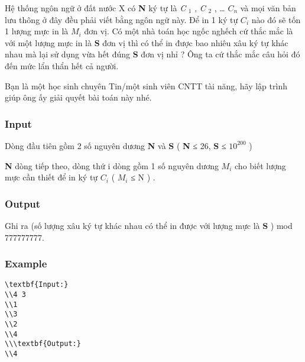 



   Hệ thống ngôn ngữ ở đất nước X có   \textbf{    N   }   ký tự là   \emph{    C   }$_    1   $   ,   \emph{    C   }$_    2   $   , …   \emph{    $C_{n}$}   và mọi văn bản lưu thông ở đây đều phải viết bằng ngôn ngữ này. Để in 1 ký tự   \emph{    $C_{i}$}   nào đó sẽ tốn 1 lượng mực in là   \emph{    $M_{i}$}   đơn vị. Có một nhà toán học ngốc nghếch cứ thắc mắc là với một lượng mực in là   \textbf{    S   }   đơn vị thì có thể in được bao nhiêu xâu ký tự khác nhau mà lại sử dụng vừa hết đúng   \textbf{    S   }   đơn vị nhỉ ? Ông ta cứ thắc mắc câu hỏi đó đến mức lẩn thẩn hết cả người.  

   Bạn là một học sinh chuyên Tin/một sinh viên CNTT tài năng, hãy lập trình giúp ông ấy giải quyết bài toán này nhé.  

\subsubsection{   Input  }

   Dòng đầu tiên gồm 2 số nguyên dương   \textbf{    N   }   và   \textbf{    S   }   (   \textbf{    N   }   ≤ 26,   \textbf{    S   }   ≤ $10^{200}$   )  

\textbf{    N   }   dòng tiếp theo, dòng thứ i dòng gồm 1 số nguyên dương $M_{i}$   cho biết lượng mực cần thiết để in ký tự $C_{i}$   ( $M_{i}$   ≤ N ) .  

\subsubsection{   Output  }

   Ghi ra (số lượng xâu ký tự khác nhau có thể in được với lượng mực là   \textbf{    S   }   ) mod 777777777.  

\subsubsection{   Example  }
\begin{verbatim}
\textbf{Input:}
\\4 3
\\1
\\3
\\2
\\4
\\\textbf{Output:}
\\4\end{verbatim}
